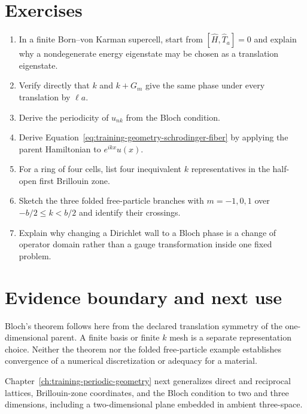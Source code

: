 \section{Exercises}

\begin{enumerate}
  \item In a finite Born--von Karman supercell, start from
        $[\widehat H,\widehat T_a]=0$ and explain why a nondegenerate energy
        eigenstate may be chosen as a translation eigenstate.
  \item Verify directly that $k$ and $k+G_m$ give the same phase under every
        translation by $\ell a$.
  \item Derive the periodicity of $u_{nk}$ from the Bloch condition.
  \item Derive Equation~\eqref{eq:training-geometry-schrodinger-fiber} by
        applying the parent Hamiltonian to $e^{ikx}u(x)$.
  \item For a ring of four cells, list four inequivalent $k$ representatives in
        the half-open first Brillouin zone.
  \item Sketch the three folded free-particle branches with $m=-1,0,1$ over
        $-b/2\leq k<b/2$ and identify their crossings.
  \item Explain why changing a Dirichlet wall to a Bloch phase is a change of
        operator domain rather than a gauge transformation inside one fixed
        problem.
\end{enumerate}

\section{Evidence boundary and next use}

Bloch's theorem follows here from the declared translation symmetry of the
one-dimensional parent. A finite basis or finite $k$ mesh is a separate
representation choice. Neither the theorem nor the folded free-particle
example establishes convergence of a numerical discretization or adequacy for
a material.

Chapter~\ref{ch:training-periodic-geometry} next generalizes direct and
reciprocal lattices, Brillouin-zone coordinates, and the Bloch condition to two
and three dimensions, including a two-dimensional plane embedded in ambient
three-space.
